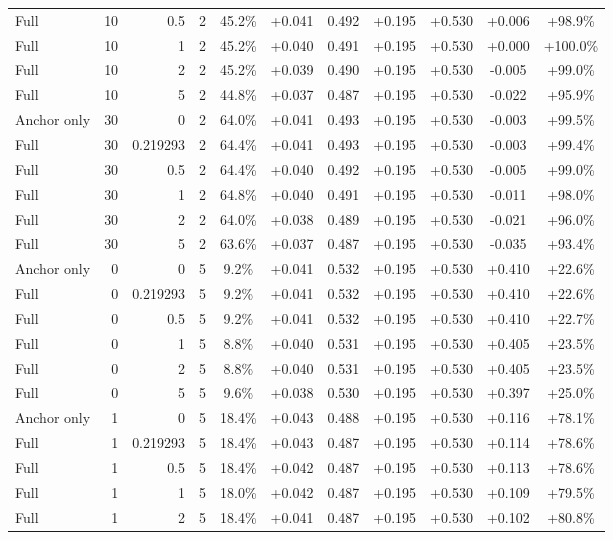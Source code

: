 \begin{table}[htbp]
\begin{tabular}{lrrrccccccc}
Full & 10 & 0.5 & 2 & 45.2\% & +0.041 & 0.492 & +0.195 & +0.530 & +0.006 & +98.9\% \\
Full & 10 & 1 & 2 & 45.2\% & +0.040 & 0.491 & +0.195 & +0.530 & +0.000 & +100.0\% \\
Full & 10 & 2 & 2 & 45.2\% & +0.039 & 0.490 & +0.195 & +0.530 & -0.005 & +99.0\% \\
Full & 10 & 5 & 2 & 44.8\% & +0.037 & 0.487 & +0.195 & +0.530 & -0.022 & +95.9\% \\
Anchor only & 30 & 0 & 2 & 64.0\% & +0.041 & 0.493 & +0.195 & +0.530 & -0.003 & +99.5\% \\
Full & 30 & 0.219293 & 2 & 64.4\% & +0.041 & 0.493 & +0.195 & +0.530 & -0.003 & +99.4\% \\
Full & 30 & 0.5 & 2 & 64.4\% & +0.040 & 0.492 & +0.195 & +0.530 & -0.005 & +99.0\% \\
Full & 30 & 1 & 2 & 64.8\% & +0.040 & 0.491 & +0.195 & +0.530 & -0.011 & +98.0\% \\
Full & 30 & 2 & 2 & 64.0\% & +0.038 & 0.489 & +0.195 & +0.530 & -0.021 & +96.0\% \\
Full & 30 & 5 & 2 & 63.6\% & +0.037 & 0.487 & +0.195 & +0.530 & -0.035 & +93.4\% \\
Anchor only & 0 & 0 & 5 & 9.2\% & +0.041 & 0.532 & +0.195 & +0.530 & +0.410 & +22.6\% \\
Full & 0 & 0.219293 & 5 & 9.2\% & +0.041 & 0.532 & +0.195 & +0.530 & +0.410 & +22.6\% \\
Full & 0 & 0.5 & 5 & 9.2\% & +0.041 & 0.532 & +0.195 & +0.530 & +0.410 & +22.7\% \\
Full & 0 & 1 & 5 & 8.8\% & +0.040 & 0.531 & +0.195 & +0.530 & +0.405 & +23.5\% \\
Full & 0 & 2 & 5 & 8.8\% & +0.040 & 0.531 & +0.195 & +0.530 & +0.405 & +23.5\% \\
Full & 0 & 5 & 5 & 9.6\% & +0.038 & 0.530 & +0.195 & +0.530 & +0.397 & +25.0\% \\
Anchor only & 1 & 0 & 5 & 18.4\% & +0.043 & 0.488 & +0.195 & +0.530 & +0.116 & +78.1\% \\
Full & 1 & 0.219293 & 5 & 18.4\% & +0.043 & 0.487 & +0.195 & +0.530 & +0.114 & +78.6\% \\
Full & 1 & 0.5 & 5 & 18.4\% & +0.042 & 0.487 & +0.195 & +0.530 & +0.113 & +78.6\% \\
Full & 1 & 1 & 5 & 18.0\% & +0.042 & 0.487 & +0.195 & +0.530 & +0.109 & +79.5\% \\
Full & 1 & 2 & 5 & 18.4\% & +0.041 & 0.487 & +0.195 & +0.530 & +0.102 & +80.8\% \\

\end{tabular}
\end{table}
